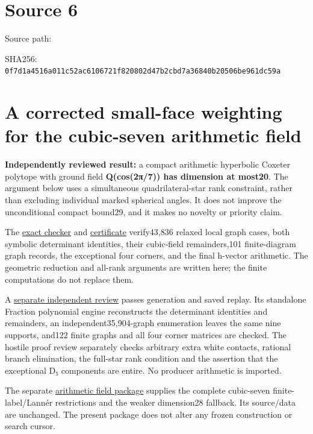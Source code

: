 \documentclass[
  10pt,
]{report}
\begin{document}
\chapter{Source 6}\label{source-6}

Source path: 

SHA256:
\nolinkurl{0f7d1a4516a011c52ac6106721f820802d47b2cbd7a36840b20506be961dc59a}

\chapter{A corrected small-face weighting for the cubic-seven arithmetic
field}\label{a-corrected-small-face-weighting-for-the-cubic-seven-arithmetic-field}

\textbf{Independently reviewed result:} a compact arithmetic hyperbolic
Coxeter polytope with ground field \textbf{Q(cos(2π/7)) has dimension at
most20}. The argument below uses a simultaneous quadrilateral-star rank
constraint, rather than excluding individual marked spherical angles. It
does not improve the unconditional compact bound29, and it makes no
novelty or priority claim.

The \href{../scripts/fresh_compact_global_bound_20261015.py}{exact
checker} and
\href{fresh_compact_global_bound_20261015.json}{certificate}
verify43,836 relaxed local graph cases, both symbolic determinant
identities, their cubic-field remainders,101 finite-diagram graph
records, the exceptional four corners, and the final h-vector
arithmetic. The geometric reduction and all-rank arguments are written
here; the finite computations do not replace them.

A \href{fresh_compact_global_bound_20261015_review.md}{separate
independent review} passes generation and saved replay. Its standalone
Fraction polynomial engine reconstructs the determinant identities and
remainders, an independent35,904-graph enumeration leaves the same nine
supports, and122 finite graphs and all four corner matrices are checked.
The hostile proof review separately checks arbitrary extra white
contacts, rational branch elimination, the full-star rank condition and
the assertion that the exceptional D₅ components are entire. No producer
arithmetic is imported.

The separate \href{fresh_arithmetic_highdim_20261015.md}{arithmetic
field package} supplies the complete cubic-seven finite-label/Lannér
restrictions and the weaker dimension28 fallback. Its source/data are
unchanged. The present package does not alter any frozen construction or
search cursor.
\end{document}
